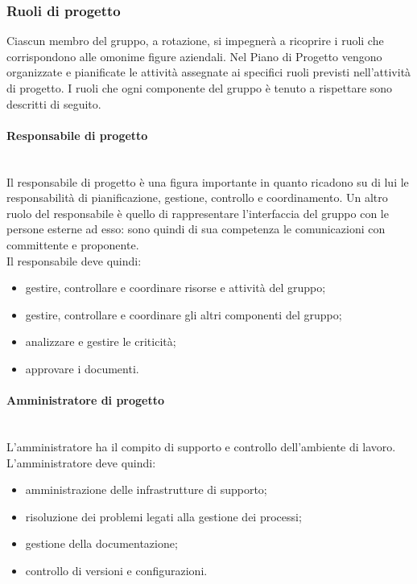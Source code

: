 		\subsubsection{Ruoli di progetto}
		Ciascun membro del gruppo, a rotazione, si impegnerà a ricoprire i  ruoli che corrispondono alle omonime figure aziendali. Nel Piano di Progetto vengono organizzate e pianificate le attività assegnate ai specifici ruoli previsti nell'attività di progetto. I ruoli che ogni componente del gruppo è tenuto a rispettare sono descritti di seguito.
			\paragraph{Responsabile di progetto} \mbox{}\\
			Il responsabile di progetto è una figura importante in quanto ricadono su di lui le responsabilità di pianificazione, gestione, controllo e coordinamento. Un altro ruolo del responsabile è quello di rappresentare l'interfaccia del gruppo con le persone esterne ad esso: sono quindi di sua competenza le comunicazioni con committente e proponente. \\
			Il responsabile deve quindi:
			\begin{itemize}
				\item gestire, controllare e coordinare risorse e attività del gruppo;
				\item  gestire, controllare e coordinare gli altri componenti del gruppo;
				\item analizzare e gestire le criticità;
				\item approvare i documenti.
			\end{itemize}
			\paragraph{Amministratore di progetto} \mbox{}\\
			L'amministratore ha il compito di supporto e controllo dell'ambiente di lavoro. \\
			L'amministratore deve quindi:
			\begin{itemize}
				\item amministrazione delle infrastrutture di supporto;
				\item risoluzione dei problemi legati alla gestione dei processi;
				\item gestione della documentazione;
				\item controllo di versioni e configurazioni.
			\end{itemize}
